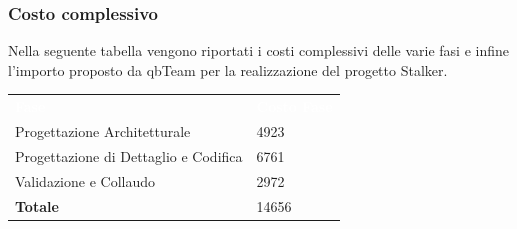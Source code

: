 \subsubsection{Costo complessivo}
Nella seguente tabella vengono riportati i costi complessivi delle varie fasi e infine l'importo proposto da qbTeam per la realizzazione del progetto Stalker.\\
{
	\renewcommand{\arraystretch}{2}
	\centering
	\begin{longtable}{ C{5cm} C{5cm}}
		\textcolor{white}{\textbf{Fase}} & \textcolor{white}{\textbf{Costo Fase}}\\	
		
		Progettazione Architetturale & 4923 \\
		Progettazione di Dettaglio e Codifica & 6761 \\
		Validazione e Collaudo & 2972 \\
		\textbf{Totale} & 14656\\
		
	\end{longtable}
}



